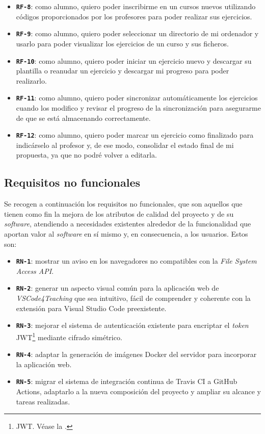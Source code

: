 \begin{itemize}
    \item \texttt{\textbf{RF-8}}: como alumno, quiero poder inscribirme en un cursos nuevos utilizando códigos proporcionados por los profesores para poder realizar sus ejercicios.
    \item \texttt{\textbf{RF-9}}: como alumno, quiero poder seleccionar un directorio de mi ordenador y usarlo para poder visualizar los ejercicios de un curso y sus ficheros.
    \item \texttt{\textbf{RF-10}}: como alumno, quiero poder iniciar un ejercicio nuevo y descargar su plantilla o reanudar un ejercicio y descargar mi progreso para poder realizarlo.
    \item \texttt{\textbf{RF-11}}: como alumno, quiero poder sincronizar automáticamente los ejercicios cuando los modifico y revisar el progreso de la sincronización para asegurarme de que se está almacenando correctamente.
    \item \texttt{\textbf{RF-12}}: como alumno, quiero poder marcar un ejercicio como finalizado para indicárselo al profesor y, de ese modo, consolidar el estado final de mi propuesta, ya que no podré volver a editarla.
\end{itemize}

\subsection{Requisitos no funcionales}
\label{subsec:listaReqsNoFuncionales}
Se recogen a continuación los requisitos no funcionales, que son aquellos que tienen como fin la mejora de los atributos de calidad del proyecto y de su \textit{software}, atendiendo a necesidades existentes alrededor de la funcionalidad que aportan valor al \textit{software} en sí mismo y, en consecuencia, a los usuarios. Estos son:
\begin{itemize}
    \item \texttt{\textbf{RN-1}}: mostrar un aviso en los navegadores no compatibles con la \textit{File System Access API}.
    \item \texttt{\textbf{RN-2}}: generar un aspecto visual común para la aplicación web de \textit{VSCode4Teaching} que sea intuitivo, fácil de comprender y coherente con la extensión para Visual Studio Code preexistente.
    \item \texttt{\textbf{RN-3}}: mejorar el sistema de autenticación existente para encriptar el \textit{token} JWT\footnote{JWT. Véase la .} mediante cifrado simétrico.
    \item \texttt{\textbf{RN-4}}: adaptar la generación de imágenes Docker del servidor para incorporar la aplicación web.
    \item \texttt{\textbf{RN-5}}: migrar el sistema de integración continua de Travis CI a GitHub Actions, adaptarlo a la nueva composición del proyecto y ampliar su alcance y tareas realizadas.
\end{itemize}
